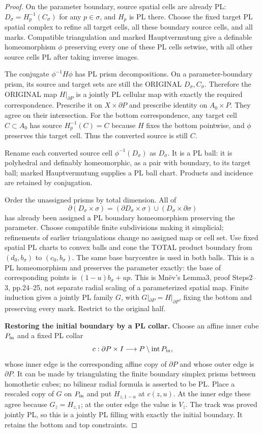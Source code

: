 \begin{proof}
On the parameter boundary, source spatial cells are
already PL: $D_\sigma=H_p^{-1}(C_\sigma)$ for any
$p\in\sigma$, and $H_p$ is PL there. Choose the fixed
target PL spatial complex to refine all target cells,
all these boundary source cells, and all marks.
Compatible triangulation and marked Hauptvermutung give
a definable homeomorphism $\phi$ preserving every one of
these PL cells setwise, with all other source cells PL
after taking inverse images.

The conjugate $\phi^{-1}H\phi$ has PL prism decompositions.
On a parameter-boundary prism, its source and target sets
are still the ORIGINAL $D_\sigma,C_\sigma$. Therefore
the ORIGINAL map $H|_{\partial P}$ is a jointly PL
cellular map with exactly the required correspondence.
Prescribe it on $X\times\partial P$ and prescribe identity
on $A_0\times P$. They agree on their intersection.
For the bottom correspondence, any target cell
$C\subset A_0$ has source $H_p^{-1}(C)=C$ because $H$
fixes the bottom pointwise, and $\phi$ preserves this
target cell. Thus the converted source is still $C$.

Rename each converted source cell $\phi^{-1}(D_\sigma)$
as $D_\sigma$. It is a PL ball: it is polyhedral and
definably homeomorphic, as a pair with boundary, to its
target ball; marked Hauptvermutung supplies a PL ball
chart. Products and incidence are retained by conjugation.

Order the unassigned prisms by total dimension. All of
\[
 \partial(D_\sigma\times\sigma)
 =(\partial D_\sigma\times\sigma)\cup
                      (D_\sigma\times\partial\sigma)
\]
has already been assigned a PL boundary homeomorphism
preserving the parameter. Choose compatible finite
subdivisions making it simplicial; refinements of earlier
triangulations change no assigned map or cell set.
Use fixed spatial PL charts to convex balls and cone
the TOTAL product boundary from $(d_0,b_\sigma)$ to
$(c_0,b_\sigma)$. The same base barycentre is used in
both balls. This is a PL homeomorphism and preserves
the parameter exactly: the base of corresponding points
is $(1-u)b_\sigma+up$. This is Mn\"ev's Lemma3,
proof Steps2--3, pp.24--25, not separate radial scaling
of a parameterized spatial map.
Finite induction gives a jointly PL family $G$, with
$G|_{\partial P}=H|_{\partial P}$, fixing the bottom
and preserving every mark. Restrict to the original half.

\textbf{Restoring the initial boundary by a PL collar.}\quad
Choose an affine inner cube $P_{\rm in}$ and a fixed PL
collar
\[
 c:\partial P\times I\longrightarrow
                    P\setminus\operatorname{int}P_{\rm in},
\]
whose inner edge is the corresponding affine copy of
$\partial P$ and whose outer edge is $\partial P$.
It can be made by triangulating the finite boundary
simplex prisms between homothetic cubes; no bilinear
radial formula is asserted to be PL.
Place a rescaled copy of $G$ on $P_{\rm in}$ and put
$H_{z,1-u}$ at $c(z,u)$. At the inner edge these agree
because $G_z=H_{z,1}$; at the outer edge the value is
$V_z$. The track was proved jointly PL, so this is
a jointly PL filling with exactly the initial boundary.
It retains the bottom and top constraints.


\end{proof}
